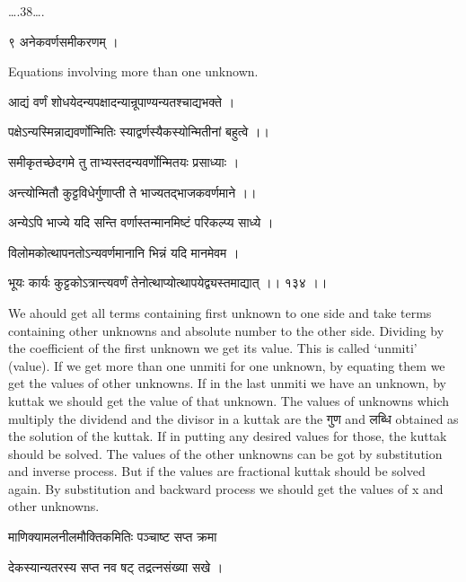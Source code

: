 \documentclass[]{article}
\date{}
\begin{document}
{\ldots{}.38\ldots{}.}

{९ अनेकवर्णसमीकरणम् । }

{Equations involving more than one unknown.}

{आद्यं वर्णं शोधयेदन्यपक्षादन्यान्रूपाण्यन्यतश्चाद्यभक्ते । }

{पक्षेऽन्यस्मिन्नाद्यवर्णोन्मितिः स्याद्वर्णस्यैकस्योन्मितीनां बहुत्वे
।। }

{समीकृतच्छेदगमे तु ताभ्यस्तदन्यवर्णोन्मितयः प्रसाध्याः । }

{अन्त्योन्मितौ कुट्टविधेर्गुणाप्ती ते भाज्यतद्भाजकवर्णमाने ।। }

{अन्येऽपि भाज्ये यदि सन्ति वर्णास्तन्मानमिष्टं परिकल्प्य साध्ये । }

{विलोमकोत्थापनतोऽन्यवर्णमानानि भिन्नं यदि मानमेवम । }

{भूयः कार्यः कुट्टकोऽत्रान्त्यवर्णं तेनोत्थाप्योत्थापयेद्व्यस्तमाद्यात्
।। १३४ ।। }

{We ahould get all terms containing first unknown to one side and take
terms containing other unknowns and absolute number to the other side.
Dividing by the coefficient of the first unknown we get its value. This
is called `unmiti' (value). If we get more than one unmiti for one
unknown, by equating them we get the values of other unknowns. If in the
last unmiti we have an unknown, by kuttak we should get the value of
that unknown. The values of unknowns which multiply the dividend and the
divisor in a kuttak are the गुण and लब्धि obtained as the solution of
the kuttak. If in putting any desired values for those, the kuttak
should be solved. The values of the other unknowns can be got by
substitution and inverse process. But if the values are fractional
kuttak should be solved again. By substitution and backward process we
should get the values of x and other unknowns.}

{माणिक्यामलनीलमौक्तिकमितिः पञ्चाष्ट सप्त क्रमा }

{देकस्यान्यतरस्य सप्त नव षट् तद्रत्नसंख्या सखे ।}{\\
}
\end{document}
